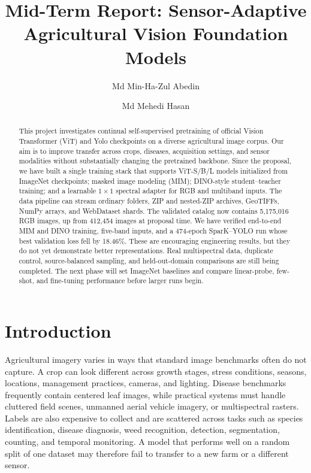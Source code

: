 \documentclass[10pt,twocolumn,letterpaper]{article}
\title{Mid-Term Report: Sensor-Adaptive Agricultural Vision Foundation Models}
\author{
Md Min-Ha-Zul Abedin \and
Md Mehedi Hasan}
\begin{document}
\maketitle

\begin{abstract}
This project investigates continual self-supervised pretraining of official
Vision Transformer (ViT) and Yolo checkpoints on a diverse agricultural image corpus.
Our aim is to improve transfer across crops, diseases, acquisition settings, and
sensor modalities without substantially changing the pretrained backbone. Since
the proposal, we have built a single training stack that supports ViT-S/B/L
models initialized from ImageNet checkpoints; masked
image modeling (MIM); DINO-style student--teacher training; and a learnable
$1\!\times\!1$ spectral adapter for RGB and multiband inputs. The data pipeline
can stream ordinary folders, ZIP and nested-ZIP archives, GeoTIFFs, NumPy arrays,
and WebDataset shards. The validated catalog now contains 5,175,016 RGB images,
up from 412,454 images at proposal time. We have verified end-to-end MIM and
DINO training, five-band inputs, and a 474-epoch SparK--YOLO run whose best
validation loss fell by 18.46\%. These are encouraging engineering results, but
they do not yet demonstrate better representations. Real multispectral data,
duplicate control, source-balanced sampling, and held-out-domain comparisons are
still being completed. The next phase will set ImageNet baselines and compare
linear-probe, few-shot, and fine-tuning performance before larger runs begin.
\end{abstract}

\section{Introduction}
Agricultural imagery varies in ways that standard image benchmarks often do not
capture. A crop can look different across growth stages, stress conditions,
seasons, locations, management practices, cameras, and lighting. Disease
benchmarks frequently contain centered leaf images, while practical systems must
handle cluttered field scenes, unmanned aerial vehicle imagery, or multispectral
rasters. Labels are also expensive to collect and are scattered across tasks such
as species identification, disease diagnosis, weed recognition, detection,
segmentation, counting, and temporal monitoring. A model that performs well on
a random split of one dataset may therefore fail to transfer to a new farm or a
different sensor.
\end{document}
